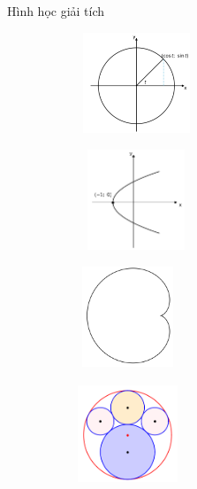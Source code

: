 \begin{frame}{Hình học giải tích}
    \begin{figure}[htbp]
    \centering
    \begin{subfigure}[t]{0.45\textwidth}
        \centering
        \includegraphics[width=3.5cm, height=3cm]{Slides/figure/duongtronthamso - Copy.png}
    \end{subfigure}
    \hfill
    \begin{subfigure}[t]{0.45\textwidth}
        \centering
        \includegraphics[width=3.5cm, height=3cm]{Slides/figure/parabolngang - Copy.png}
    \end{subfigure}
    \hfill
    \begin{subfigure}[t]{0.45\textwidth}
        \centering
        \includegraphics[width=3cm, height=3cm]{Slides/figure/cardioid - Copy.png}
    \end{subfigure}
    \hfill
    \begin{subfigure}[t]{0.45\textwidth}
        \centering
        \includegraphics[width=3cm, height=3cm]{Slides/figure/4circle.png}
    \end{subfigure}
\end{figure}
\end{frame}